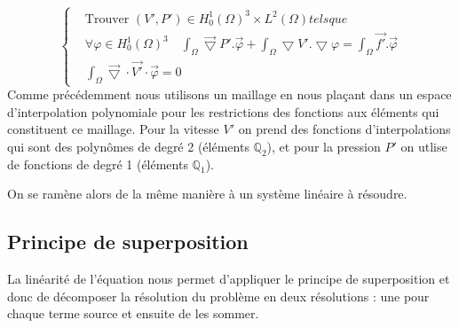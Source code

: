 \documentclass[a4paper,12pt,titlepage]{report}
\begin{document}
\begin{onehalfspace}
\begin{equation*}
\left\{
\begin{aligned}
	&\text{Trouver } (V',P') \in H_0^1(\Omega)^3 \times L^2(\Omega) tels que \\
	&\forall \varphi \in H_0^1(\Omega)^3 \quad  \int_\Omega\vec{\bigtriangledown}P'. \vec \varphi + \int_{\Omega}\bigtriangledown V'. \bigtriangledown \varphi = \int_\Omega\vec{f'}. \vec \varphi \\
	&\int_\Omega\vec{\bigtriangledown}\cdot \vec{V'} \cdot \vec \varphi = 0
\end{aligned}
\right.
\end{equation*}
Comme précédemment nous utilisons un maillage en nous plaçant dans un espace d'interpolation polynomiale pour les restrictions des fonctions aux éléments qui constituent ce maillage. Pour la vitesse $V'$ on prend des fonctions d'interpolations qui sont des polynômes de degré 2 (éléments $\mathbb{Q}_2$), et pour la pression $P'$ on utlise de fonctions de degré 1 (éléments $\mathbb{Q}_1$).

On se ramène alors de la même manière à un système linéaire à résoudre.

\subsection{Principe de superposition}

La linéarité de l'équation nous permet d'appliquer le principe de superposition et donc de décomposer la résolution du problème en deux résolutions : une pour chaque terme source et ensuite de les sommer.


\end{onehalfspace}
\end{document}
